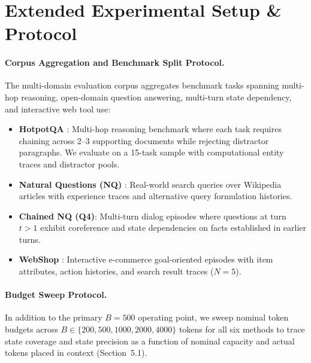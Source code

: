 \documentclass{article}
\begin{document}
\section{Extended Experimental Setup \& Protocol}

\paragraph{Corpus Aggregation and Benchmark Split Protocol.} The multi-domain evaluation corpus aggregates benchmark tasks spanning multi-hop reasoning, open-domain question answering, multi-turn state dependency, and interactive web tool use:
\begin{itemize}
\item \textbf{HotpotQA} \citep{yang2018hotpotqa}: Multi-hop reasoning benchmark where each task requires chaining across 2--3 supporting documents while rejecting distractor paragraphs. We evaluate on a 15-task sample with computational entity traces and distractor pools.
\item \textbf{Natural Questions (NQ)} \citep{kwiatkowski2019naturalquestions}: Real-world search queries over Wikipedia articles with experience traces and alternative query formulation histories.
\item \textbf{Chained NQ (Q4)}: Multi-turn dialog episodes where questions at turn $t > 1$ exhibit coreference and state dependencies on facts established in earlier turns.
\item \textbf{WebShop} \citep{yao2022webshop}: Interactive e-commerce goal-oriented episodes with item attributes, action histories, and search result traces ($N=5$).
\end{itemize}

\paragraph{Budget Sweep Protocol.} In addition to the primary $B=500$ operating point, we sweep nominal token budgets across $B \in \{200, 500, 1000, 2000, 4000\}$ tokens for all six methods to trace state coverage and state precision as a function of nominal capacity and actual tokens placed in context (Section~5.1).
\end{document}
